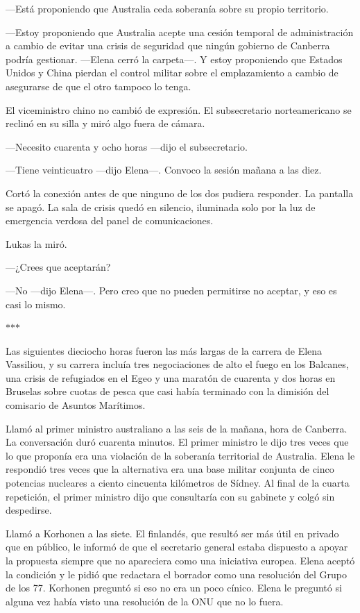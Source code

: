 \documentclass[11pt,a5paper,twoside]{book}
\begin{document}
—Está proponiendo que Australia ceda soberanía sobre su propio territorio.

—Estoy proponiendo que Australia acepte una cesión temporal de administración a cambio de evitar una crisis de seguridad que ningún gobierno de Canberra podría gestionar. —Elena cerró la carpeta—. Y estoy proponiendo que Estados Unidos y China pierdan el control militar sobre el emplazamiento a cambio de asegurarse de que el otro tampoco lo tenga.

El viceministro chino no cambió de expresión. El subsecretario norteamericano se reclinó en su silla y miró algo fuera de cámara.

—Necesito cuarenta y ocho horas —dijo el subsecretario.

—Tiene veinticuatro —dijo Elena—. Convoco la sesión mañana a las diez.

Cortó la conexión antes de que ninguno de los dos pudiera responder. La pantalla se apagó. La sala de crisis quedó en silencio, iluminada solo por la luz de emergencia verdosa del panel de comunicaciones.

Lukas la miró.

—¿Crees que aceptarán?

—No —dijo Elena—. Pero creo que no pueden permitirse no aceptar, y eso es casi lo mismo.

\vspace{1.5em}
\begin{center}$\ast$\quad$\ast$\quad$\ast$\end{center}
\vspace{1.5em}

Las siguientes dieciocho horas fueron las más largas de la carrera de Elena Vassiliou, y su carrera incluía tres negociaciones de alto el fuego en los Balcanes, una crisis de refugiados en el Egeo y una maratón de cuarenta y dos horas en Bruselas sobre cuotas de pesca que casi había terminado con la dimisión del comisario de Asuntos Marítimos.

Llamó al primer ministro australiano a las seis de la mañana, hora de Canberra. La conversación duró cuarenta minutos. El primer ministro le dijo tres veces que lo que proponía era una violación de la soberanía territorial de Australia. Elena le respondió tres veces que la alternativa era una base militar conjunta de cinco potencias nucleares a ciento cincuenta kilómetros de Sídney. Al final de la cuarta repetición, el primer ministro dijo que consultaría con su gabinete y colgó sin despedirse.

Llamó a Korhonen a las siete. El finlandés, que resultó ser más útil en privado que en público, le informó de que el secretario general estaba dispuesto a apoyar la propuesta siempre que no apareciera como una iniciativa europea. Elena aceptó la condición y le pidió que redactara el borrador como una resolución del Grupo de los 77. Korhonen preguntó si eso no era un poco cínico. Elena le preguntó si alguna vez había visto una resolución de la ONU que no lo fuera.
\end{document}
